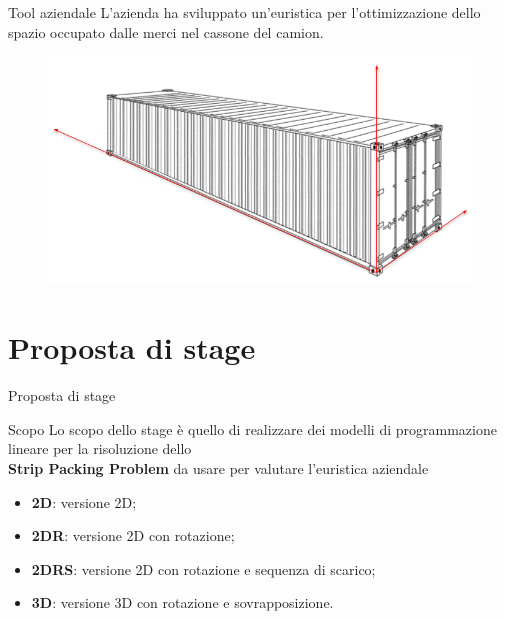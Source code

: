 \documentclass{beamer}
\begin{document}
\begin{frame}{Tool aziendale}
	L'azienda ha sviluppato un'euristica per l'ottimizzazione dello spazio occupato dalle merci nel cassone del camion.
	\begin{figure}[H]
		\begin{center} \includegraphics[width=1\linewidth]{figures/container_arrows}
		\end{center}
	\end{figure}
\end{frame}

\section{Proposta di stage}

\begin{frame}{Proposta di stage}
	\begin{alertblock}{Scopo}
		Lo scopo dello stage \`e  quello di realizzare dei modelli di programmazione lineare per la risoluzione dello \\ \textbf{Strip Packing Problem} da usare per valutare l'euristica aziendale
	\end{alertblock}
	\begin{itemize}
		\item \textbf{2D}: versione 2D;
		\item \textbf{2DR}: versione 2D con rotazione;
		\item \textbf{2DRS}: versione 2D con rotazione e sequenza di scarico;
		\item \textbf{3D}: versione 3D con rotazione e sovrapposizione.
	\end{itemize}
\end{frame}
\end{document}
